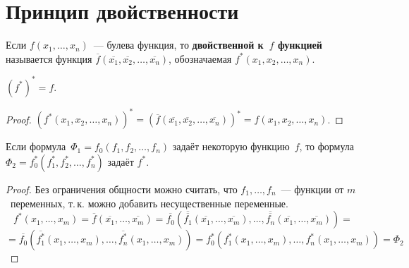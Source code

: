 \section{Принцип двойственности}
 Если $f(x_1, \ldots, x_n)$~--- булева функция, то \textbf{двойственной к~$f$ функцией} называется функция $\overline f(\overline{x_1}, \overline{x_2}, \ldots, \overline{x_n})$, обозначаемая $f^*(x_1, x_2, \ldots, x_n)$.

\begin{statement}
$(f^*)^* = f$.
\end{statement}
\begin{proof}
$(f^*(x_1, x_2, \ldots, x_n))^*
= (\overline f(\overline{x_1}, \overline{x_2}, \ldots, \overline{x_n}))^*
= f(x_1, x_2, \ldots, x_n)$.
\end{proof}

\begin{theorem}
Если формула~$\Phi_1 = f_0(f_1, f_2, \ldots, f_n)$ задаёт некоторую функцию~$f$, то формула~$\Phi_2 = f_0^*(f_1^*, f_2^*, \ldots, f_n^*)$ задаёт $f^*$.
\end{theorem}
\begin{proof}
Без ограничения общности можно считать, что $f_1, \ldots, f_n$~--- функции от $m$~переменных, т.\,к. можно добавить несущественные переменные.
\begin{equation*}
f^*(x_1, \ldots, x_m) =
\overline f(\overline{x_1}, \ldots, \overline{x_m}) =
\overline{f_0}(\overline{\overline{f_1}}(\overline{x_1}, \ldots, \overline{x_m}), \ldots, \overline{\overline{f_n}}(\overline{x_1}, \ldots, \overline{x_m})) =
\end{equation*}
\begin{equation*}
= \overline{f_0}(\overline{f_1^*}(x_1, \ldots, x_m), \ldots, \overline{f_n^*}(x_1, \ldots, x_m)) =
f_0^*(f_1^*(x_1, \ldots, x_m), \ldots, f_n^*(x_1, \ldots, x_m)) =
\Phi_2
\end{equation*}
\end{proof}